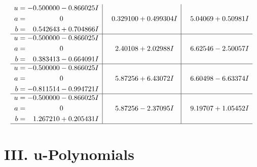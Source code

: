 \documentclass[1p]{elsarticle_modified}
\theoremstyle{definition}
\begin{document}
$$\begin{array}{c|c|c}
\begin{aligned}
u &= -0.500000 - 0.866025 I \\
a &= \phantom{-0.000000 } 0 \\
b &= \phantom{-}0.542643 + 0.704866 I\end{aligned}
 & \phantom{-}0.329100 + 0.499304 I & \phantom{-}5.04069 + 0.50981 I \\ \hline\begin{aligned}
u &= -0.500000 - 0.866025 I \\
a &= \phantom{-0.000000 } 0 \\
b &= \phantom{-}0.383413 - 0.664091 I\end{aligned}
 & \phantom{-}2.40108 + 2.02988 I & \phantom{-}6.62546 - 2.50057 I \\ \hline\begin{aligned}
u &= -0.500000 - 0.866025 I \\
a &= \phantom{-0.000000 } 0 \\
b &= -0.811514 - 0.994721 I\end{aligned}
 & \phantom{-}5.87256 + 6.43072 I & \phantom{-}6.60498 - 6.63374 I \\ \hline\begin{aligned}
u &= -0.500000 - 0.866025 I \\
a &= \phantom{-0.000000 } 0 \\
b &= \phantom{-}1.267210 + 0.205431 I\end{aligned}
 & \phantom{-}5.87256 - 2.37095 I & \phantom{-}9.19707 + 1.05452 I\\
 \hline 
 \end{array}$$\newpage
\newpage\renewcommand{\arraystretch}{1}
\centering \section*{ III. u-Polynomials}
\end{document}
